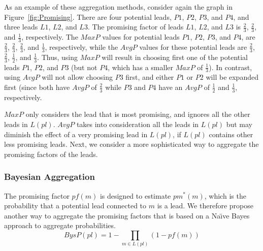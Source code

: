 \documentclass[prodmode,acmtecs]{acmsmall} %
\newcommand{\pf}{{\textit pf}}
\begin{document}
As an example of these aggregation methods, consider again the graph in Figure~\ref{fig:Promising}. 
There are four potential leads, $P1$, $P2$, $P3$, and $P4$, and three leads $L1$, $L2$, and $L3$. 
The promising factor of leads $L1$, $L2$, and $L3$ is $\frac{2}{3}$, $\frac{2}{3}$, and 
$\frac{1}{3}$, respectively. 
The $MaxP$ values for potential leads $P1$, $P2$, $P3$, and $P4$, are $\frac{2}{3}$, $\frac{2}{3}$, $\frac{2}{3}$, and $\frac{1}{3}$, respectively, while the $AvgP$ values for these potential leads are $\frac{2}{3}$, $\frac{2}{3}$, $\frac{1}{2}$, and $\frac{1}{3}$. Thus, using $MaxP$ will result in choosing first one of the potential leads $P1$, $P2$, and $P3$ (but not $P4$, which has a smaller $MaxP$ of $\frac{1}{3}$). In contrast, using $AvgP$ will not allow choosing $P3$ first, and either $P1$ or $P2$ will be expanded first (since both have $AvgP$ of $\frac{2}{3}$ while $P3$ and $P4$ have an $AvgP$ of $\frac{1}{2}$ and $\frac{1}{3}$, respectively. 






$MaxP$ only considers the lead that is most promising, and ignores all the other leads in $L(pl)$. $AvgP$ takes into consideration all the leads in $L(pl)$ but may diminish the effect of a very promising lead in $L(pl)$, if $L(pl)$ contains other less promising leads. Next, we consider a more sophisticated way to aggregate the promising factors of the leads.




\subsubsection{Bayesian Aggregation}
The promising factor $pf(m)$ is designed to estimate $pm^*(m)$, which is the probability that a potential lead connected to $m$ is a lead. 
We therefore propose another way to aggregate the promising factors that is based on a Na\"{\i}ve Bayes approach to aggregate probabilities.
\begin{equation}
\displaystyle BysP(pl)=1-\prod_{m\in L(pl)}(1-pf(m)) 
\end{equation}
\end{document}
